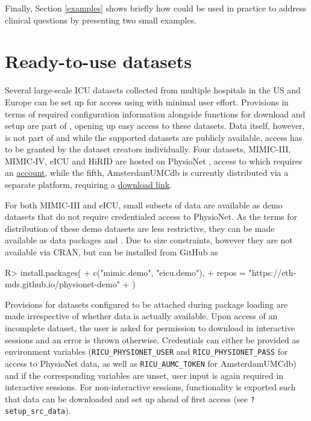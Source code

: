 \documentclass[
  notitle,
  nojss,
  noheadings]{jss}
\begin{document}
Finally, Section \ref{examples} shows briefly how  could be
used in practice to address clinical questions by presenting two small
examples.

\hypertarget{ready-to-use-datasets}{%
\section{Ready-to-use datasets}\label{ready-to-use-datasets}}

Several large-scale ICU datasets collected from multiple hospitals in
the US and Europe can be set up for access using  with minimal
user effort. Provisions in terms of required configuration information
alongside functions for download and setup are part of ,
opening up easy access to these datasets. Data itself, however, is not
part of  and while the supported datasets are publicly
available, access has to be granted by the dataset creators
individually. Four datasets, MIMIC-III, MIMIC-IV, eICU and HiRID are
hosted on PhysioNet \citep{goldberger2000}, access to which requires an
\href{https://physionet.org/register/}{account}, while the fifth,
AmsterdamUMCdb is currently distributed via a separate platform,
requiring a
\href{https://amsterdammedicaldatascience.nl/\#amsterdamumcdb}{download
link}.

For both MIMIC-III and eICU, small subsets of data are available as demo
datasets that do not require credentialed access to PhysioNet. As the
terms for distribution of these demo datasets are less restrictive, they
can be made available as data packages  and
. Due to size constraints, however they are not available
via CRAN, but can be installed from GitHub as

\begin{CodeChunk}
\begin{CodeInput}
R> install.packages(
+   c("mimic.demo", "eicu.demo"),
+   repos = "https://eth-mds.github.io/physionet-demo"
+ )
\end{CodeInput}
\end{CodeChunk}

Provisions for datasets configured to be attached during package loading
are made irrespective of whether data is actually available. Upon access
of an incomplete dataset, the user is asked for permission to download
in interactive sessions and an error is thrown otherwise. Credentials
can either be provided as environment variables
(\texttt{RICU\_PHYSIONET\_USER} and \texttt{RICU\_PHYSIONET\_PASS} for
access to PhysioNet data, as well as \texttt{RICU\_AUMC\_TOKEN} for
AmsterdamUMCdb) and if the corresponding variables are unset, user input
is again required in interactive sessions. For non-interactive sessions,
functionality is exported such that data can be downloaded and set up
ahead of first access (see \texttt{?setup\_src\_data}).
\end{document}

